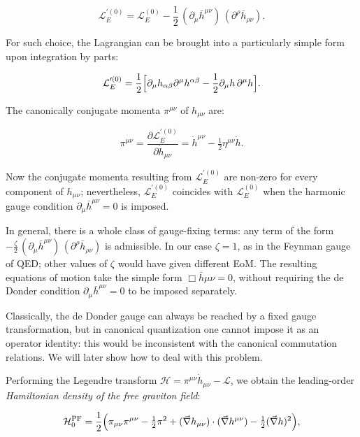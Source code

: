 \documentclass[12pt,a4paper,oneside]{article}
\numberwithin{equation}{section}   %
\begin{document}
\begin{equation} \label{DDlag}
    \mathcal{L}_E^{\prime(0)}
    = \mathcal{L}^{(0)}_E - \frac{1}{2}\, (\partial_\mu \bar{h}^{\mu\nu})\, (\partial^\rho \bar{h}_{\rho\nu}).
\end{equation}

For such choice, the Lagrangian can be brought into a
particularly simple form upon integration by parts:

\begin{equation}
    \mathcal L_E^{\prime(0)}
=\frac{1}{2}\Bigl[
\partial_\mu h_{\alpha\beta}\partial^\mu h^{\alpha\beta}
-\frac12\partial_\mu h\,\partial^\mu h\Bigr].
\end{equation}

The canonically conjugate momenta $\pi^{\mu\nu}$ of $h_{\mu\nu}$ are:

\begin{equation}
\pi^{\mu\nu}=\frac{\partial\mathcal L_E^{\prime(0)}}{\partial\dot h_{\mu\nu}}
=\dot h^{\mu\nu}-\tfrac12\eta^{\mu\nu}\dot h.
\label{pih}
\end{equation}

Now the conjugate momenta
resulting from $\mathcal{L}_E^{\prime(0)}$ are non-zero for every component
of $h_{\mu\nu}$; nevertheless, $\mathcal{L}_E^{\prime(0)}$ coincides with
$\mathcal{L}^{(0)}_E$ when the harmonic gauge condition
$\partial_\mu \bar{h}^{\mu\nu}=0$ is imposed. 

In general, there is a whole class of gauge-fixing terms: any term of the form
$-\frac{\zeta}{2}\, (\partial_\mu \bar{h}^{\mu\nu})\, (\partial^\rho \bar{h}_{\rho\nu})$
is admissible. In our case $\zeta=1$, as in the Feynman gauge of QED; other
values of $\zeta$ would have given different EoM.
The resulting equations of motion 
take the simple form $\Box \bar{h}{\mu\nu}=0$, 
without requiring the de Donder condition 
$\partial_\mu\bar{h}^{\mu\nu}=0$ to be imposed separately.


Classically, the de Donder gauge can always be reached by a fixed gauge
transformation, but in canonical quantization
one cannot impose it as an operator identity: this
would be inconsistent with the canonical commutation relations. We will
later show how to deal with this problem.


Performing the Legendre transform $\mathcal H=\pi^{\mu\nu}\dot h_{\mu\nu}-\mathcal L$,
we obtain the leading-order \textit{Hamiltonian density of the free graviton field}:

\begin{equation}
\mathcal{H}_0^{\mathrm{PF}}=\frac{1}{2}\Bigl(\pi_{\mu\nu}\pi^{\mu\nu}-\tfrac12\pi^2
+(\vec\nabla h_{\mu\nu})\cdot(\vec\nabla h^{\mu\nu})-\tfrac12(\vec\nabla h)^2\Bigr),
\label{HPF}
\end{equation}
\end{document}
